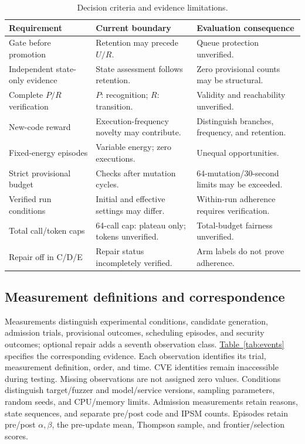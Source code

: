\documentclass[final,5p,times,number]{elsarticle}
\newcommand{\namedref}[2]{\hyperref[#2]{#1~\ref*{#2}}}
\begin{document}
\begin{table}[!tbp]
\centering\small
\caption{Decision criteria and evidence limitations.}
\label{tab:implementation}
\begin{tabularx}{\textwidth}{Y Y Y}
\toprule
Requirement & Current boundary & Evaluation consequence \\
\midrule
Gate before promotion & Retention may precede $U/R$. & Queue protection unverified. \\
Independent state-only evidence & State assessment follows retention. & Zero provisional counts may be structural. \\
Complete $P/R$ verification & $P$: recognition; $R$: transition. & Validity and reachability unverified. \\
New-code reward & Execution-frequency novelty may contribute. & Distinguish branches, frequency, and retention. \\
Fixed-energy episodes & Variable energy; zero executions. & Unequal opportunities. \\
Strict provisional budget & Checks after mutation cycles. & 64-mutation/30-second limits may be exceeded. \\
Verified run conditions & Initial and effective settings may differ. & Within-run adherence requires verification. \\
Total call/token caps & 64-call cap: plateau only; tokens unverified. & Total-budget fairness unverified. \\
Repair off in C/D/E & Repair status incompletely verified. & Arm labels do not prove adherence. \\
\bottomrule
\end{tabularx}
\end{table}

\subsection{Measurement definitions and correspondence}
Measurements distinguish experimental conditions, candidate generation, admission trials, provisional outcomes, scheduling episodes, and security outcomes; optional repair adds a seventh observation class. \namedref{Table}{tab:events} specifies the corresponding evidence. Each observation identifies its trial, measurement definition, order, and time. CVE identities remain inaccessible during testing. Missing observations are not assigned zero values. Conditions distinguish target/fuzzer and model/service versions, sampling parameters, random seeds, and CPU/memory limits. Admission measurements retain reasons, state sequences, and separate pre/post code and IPSM counts. Episodes retain pre/post $\alpha,\beta$, the pre-update mean, Thompson sample, and frontier/selection scores.
\end{document}
